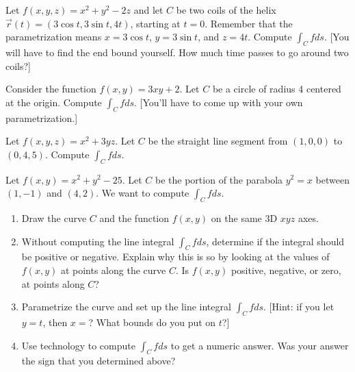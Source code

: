 \begin{problem}
%
%
  Let $f(x,y,z)=x^2+y^2-2z$ and let $C$ be two coils of the helix $\vec r(t)=(3\cos t, 3\sin t, 4t)$, starting at $t=0$. Remember that the parametrization means $x=3\cos t$, $y=3\sin t$, and $z=4t$.  Compute $\int_Cf ds$. [You will have to find the end bound yourself. How much time passes to go around two coils?]
\end{problem}

\begin{challenge}
%
%
 Consider the function $f(x,y)=3xy+2$. Let $C$ be a circle of radius 4 centered at the origin.  Compute $\int_C fds$.  [You'll have to come up with your own parametrization.]
\end{challenge}


\begin{challenge}%
%
 Let $f(x,y,z)=x^2+3yz$. Let $C$ be the straight line segment from $(1,0,0)$ to $(0,4,5)$. Compute $\int_C f ds$. 
\end{challenge}

\begin{problem}%
%
%
 Let $f(x,y)=x^2+y^2-25$. Let $C$ be the portion of the parabola $y^2=x$ between $(1,-1)$ and $(4,2)$. We want to compute $\int_C fds$.  
\begin{enumerate}
\item Draw the curve $C$ and the function $f(x,y)$ on the same 3D $xyz$ axes.
\item Without computing the line integral $\int_C fds$, determine if the integral should be positive or negative. Explain why this is so by looking at the values of $f(x,y)$ at points along the curve $C$.  Is $f(x,y)$ positive, negative, or zero, at points along $C$?
 \item Parametrize the curve and set up the line integral $\int_C f ds$. [Hint: if you let $y=t$, then $x=$? What bounds do you put on $t$?]
 \item Use technology to compute $\int_C fds$ to get a numeric answer.  Was your answer the sign that you determined above?
\end{enumerate}
\end{problem}


